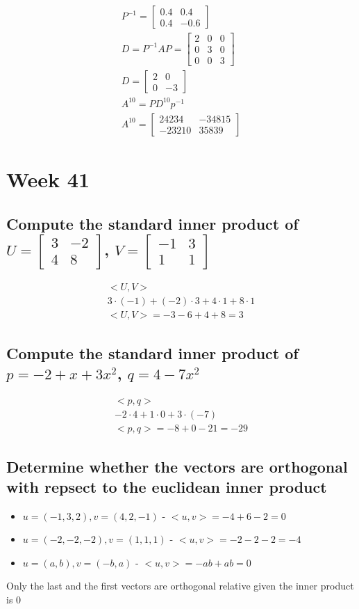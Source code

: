 \documentclass[12pt, a4paper]{article}
\begin{document}
\begin{align*}
				P^{-1}=\begin{bmatrix}0.4&0.4\\0.4&-0.6\end{bmatrix}\\
				D=P^{-1}AP=\begin{bmatrix}2&0&0\\0&3&0\\0&0&3\end{bmatrix}\\
				D=\begin{bmatrix}2&0\\0&-3\end{bmatrix}\\
				A^{10}=PD^{10}p^{-1}\\
				A^{10}=\begin{bmatrix}24234 & -34815\\-23210 & 35839\end{bmatrix}
			\end{align*}
	\section{Week 41}
		\subsection{Compute the standard inner product of $U=\begin{bmatrix}3 & -2\\ 4 & 8\end{bmatrix}$, $V=\begin{bmatrix}-1&3\\1&1\end{bmatrix}$}
			\begin{align*}
				<U,V>\\
				3\cdot (-1)+(-2)\cdot 3+4\cdot 1 + 8\cdot 1\\
				<U,V>=-3-6+4+8=3
			\end{align*}
		\subsection{Compute the standard inner product of $p=-2+x+3x^2$, $q=4-7x^2$}
			\begin{align*}
				<p,q>\\
				-2\cdot 4+1\cdot 0+3\cdot (-7)\\
				<p,q>=-8+0-21=-29
			\end{align*}
		\subsection{Determine whether the vectors are orthogonal with repsect to the euclidean inner product}
			\begin{itemize}
				\item $u=(-1,3,2),v=(4,2,-1)$ - $<u,v>= -4 + 6 -2 = 0$
				\item $u=(-2,-2,-2),v=(1,1,1)$ - $<u,v> = -2-2-2=-4$
				\item $u=(a,b),v=(-b,a)$ - $<u,v>=-ab+ab=0$
			\end{itemize}
			Only the last and the first vectors are orthogonal relative given the inner product is 0
\end{document}

